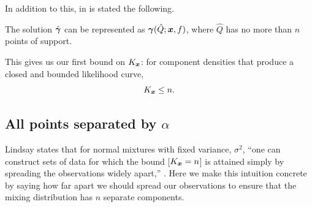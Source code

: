 	In addition to this, in \cite[Theorem 21]{Lindsay1995-sq} is stated the following.
	\begin{theorem}
		The solution $\hat{{\bm{{\gamma}}}}$ can be represented as ${\bm{{\gamma}}}(\hat{Q};{\bm{{x}}}, f)$, where $\hat{Q}$ has no more than $n$ points of support.
		\label{thm: lindsay no more than n points}
	\end{theorem}
	This gives us our first bound on $K_{\bm{{x}}}$: for component densities that produce a closed and bounded likelihood curve,
	\begin{equation}
		K_{\bm{{x}}} \leq n.
	\end{equation}

	\subsection{All points separated by \texorpdfstring{$\alpha$}{a}}
		Lindsay states that for normal mixtures with fixed variance, $\sigma^2$, ``one can construct sets of data for which the bound [$K_{\bm{{x}}} = n$] is attained simply by spreading the observations widely apart,'' \cite[Section 5.2]{Lindsay1995-sq}. Here we make this intuition concrete by saying how far apart we should spread our observations to ensure that the mixing distribution has $n$ separate components.

		
